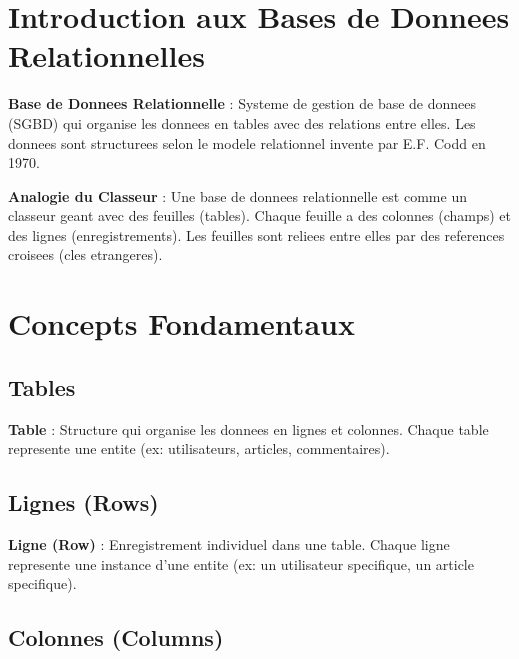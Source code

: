 \documentclass[a4paper,12pt]{book}
\begin{document}
\section{Introduction aux Bases de Donnees Relationnelles}

\begin{definitionbox}
    \textbf{Base de Donnees Relationnelle} : Systeme de gestion de base de donnees (SGBD) qui organise les donnees en tables avec des relations entre elles. Les donnees sont structurees selon le modele relationnel invente par E.F. Codd en 1970.
\end{definitionbox}

\begin{analogybox}
    \textbf{Analogie du Classeur} : Une base de donnees relationnelle est comme un classeur geant avec des feuilles (tables). Chaque feuille a des colonnes (champs) et des lignes (enregistrements). Les feuilles sont reliees entre elles par des references croisees (cles etrangeres).
\end{analogybox}

\section{Concepts Fondamentaux}

\subsection{Tables}

\begin{definitionbox}
    \textbf{Table} : Structure qui organise les donnees en lignes et colonnes. Chaque table represente une entite (ex: utilisateurs, articles, commentaires).
\end{definitionbox}

\subsection{Lignes (Rows)}

\begin{definitionbox}
    \textbf{Ligne (Row)} : Enregistrement individuel dans une table. Chaque ligne represente une instance d'une entite (ex: un utilisateur specifique, un article specifique).
\end{definitionbox}

\subsection{Colonnes (Columns)}
\end{document}
